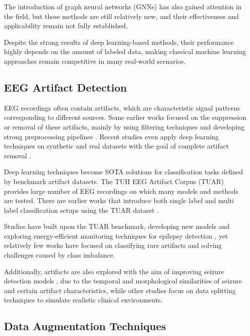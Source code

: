 The introduction of graph neural networks (GNNs) has also gained attention in the field, but these methods are still relatively new, and their effectiveness and applicability remain not fully established.

Despite the strong results of deep learning-based methods, their performance highly depends on the amount of labeled data, making classical machine learning approaches remain competitive in many real-world scenarios.

\subsection{EEG Artifact Detection}

EEG recordings often contain artifacts, which are characteristic signal patterns corresponding to different sources. Some earlier works focused on the suppression or removal of these artifacts, mainly by using filtering techniques \cite{QUAZI2017401} and developing strong preprocessing pipelines \cite{RICOOLARTE2025103702}. Recent studies even apply deep learning techniques on synthetic and real datasets with the goal of complete artifact removal \cite{FERNANDEZDERETANA2025152}\cite{app15094953}.

Deep learning techniques become SOTA solutions for classification tasks defined by benchmark artifact datasets. The TUH EEG Artifact Corpus (TUAR) \cite{9353647} provides large number of EEG recordings on which many models and methods are tested. There are earlier works that introduce both single label and multi label classification setups using the TUAR dataset \cite{TUAR}.

Studies have built upon the TUAR benchmark, developing new models \cite{TUAR2} and exploring energy-efficient monitoring techniques for epilepsy detection \cite{energy}, yet relatively few works have focused on classifying rare artifacts and solving challenges caused by class imbalance.

Additionally, artifacts are also explored with the aim of improving seizure detection models \cite{inproceedings}, due to the temporal and morphological similarities of seizure and certain artifact characteristics, while other studies focus on data splitting techniques to simulate realistic clinical environments.

\subsection{Data Augmentation Techniques}

